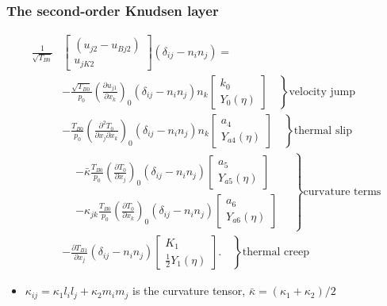 \documentclass[mathserif]{beamer} %
\newcommand{\pder}[2][]{\frac{\partial#1}{\partial#2}}
\newcommand{\pderder}[3][]{\frac{\partial^2#1}{\partial #2\partial #3}}
\newcommand{\deltann}[2]{(\delta_{#1#2}-n_#1 n_#2)}
\newcommand{\onwall}[1]{\left(#1\right)_0}
\begin{document}
\begin{frame}
    \frametitle{The second-order Knudsen layer}
    \footnotesize
    \begin{equation*}
        \begin{aligned}
            \frac1{\sqrt{T_{B0}}}&
                \begin{bmatrix} (u_{j2} - u_{Bj2}) \\ u_{jK2} \end{bmatrix}\deltann{i}{j} = \\
            &- \left.\frac{\sqrt{T_{B0}}}{p_0}\onwall{\pder[u_{j1}]{x_k}} \deltann{i}{j}n_k
                \begin{bmatrix} k_0 \\ Y_0(\eta) \end{bmatrix} \quad\right\}\text{velocity jump}\\
            &- \left.\frac{T_{B0}}{p_0}\onwall{\pderder[T_0]{x_j}{x_k}} \deltann{i}{j}n_k
                \begin{bmatrix} a_4 \\ Y_{a4}(\eta) \end{bmatrix} \quad\right\}\text{thermal slip} \\
            &\left.\begin{aligned}
                &- \bar\kappa\frac{T_{B0}}{p_0}\onwall{\pder[T_0]{x_j}} \deltann{i}{j}
                \begin{bmatrix} a_5 \\ Y_{a5}(\eta) \end{bmatrix} \\
                &- \kappa_{jk}\frac{T_{B0}}{p_0}\onwall{\pder[T_0]{x_k}} \deltann{i}{j}
                \begin{bmatrix} a_6 \\ Y_{a6}(\eta) \end{bmatrix}
            \end{aligned} \quad\right\}\text{curvature terms}\\
            &- \left.\pder[T_{B1}]{x_j} \deltann{i}{j}
                \begin{bmatrix} K_1 \\ \frac12 Y_1(\eta) \end{bmatrix}. \quad\right\}\text{thermal creep}
        \end{aligned}\label{eq:boundary_u2t}
    \end{equation*}
    \vspace{-10pt}
    \begin{itemize}
        \item \(\kappa_{ij} = \kappa_1 l_i l_j + \kappa_2 m_i m_j\) is the curvature tensor, \(\bar\kappa = (\kappa_1+\kappa_2)/2\)
    \end{itemize}
\end{frame}
\end{document}
